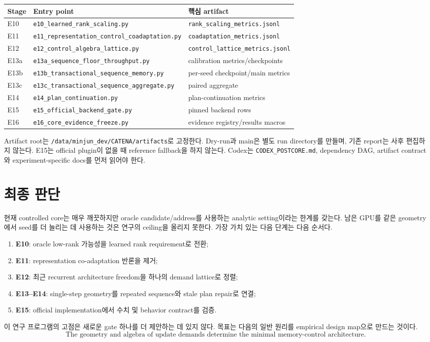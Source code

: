 \documentclass[10.3pt,a4paper]{article}
\begin{document}
\begin{center}
\begin{tabularx}{\textwidth}{l l X}
\toprule
Stage & Entry point & 핵심 artifact \\
\midrule
E10 & \texttt{e10\_learned\_rank\_scaling.py} & \texttt{rank\_scaling\_metrics.jsonl} \\
E11 & \texttt{e11\_representation\_control\_coadaptation.py} & \texttt{coadaptation\_metrics.jsonl} \\
E12 & \texttt{e12\_control\_algebra\_lattice.py} & \texttt{control\_lattice\_metrics.jsonl} \\
E13a & \texttt{e13a\_sequence\_floor\_throughput.py} & calibration metrics/checkpoints \\
E13b & \texttt{e13b\_transactional\_sequence\_memory.py} & per-seed checkpoint/main metrics \\
E13c & \texttt{e13c\_transactional\_sequence\_aggregate.py} & paired aggregate \\
E14 & \texttt{e14\_plan\_continuation.py} & plan-continuation metrics \\
E15 & \texttt{e15\_official\_backend\_gate.py} & pinned backend rows \\
E16 & \texttt{e16\_core\_evidence\_freeze.py} & evidence registry/results macros \\
\bottomrule
\end{tabularx}
\end{center}

Artifact root는 \texttt{/data/minjun\_dev/CATENA/artifacts}로 고정한다. Dry-run과 main은 별도 run directory를 만들며, 기존 report는 사후 편집하지 않는다. E15는 official plugin이 없을 때 reference fallback을 하지 않는다. Codex는 \texttt{CODEX\_POSTCORE.md}, dependency DAG, artifact contract와 experiment-specific docs를 먼저 읽어야 한다.

\section{최종 판단}
현재 controlled core는 매우 깨끗하지만 oracle candidate/address를 사용하는 analytic setting이라는 한계를 갖는다. 남은 GPU를 같은 geometry에서 seed를 더 늘리는 데 사용하는 것은 연구의 ceiling을 올리지 못한다. 가장 가치 있는 다음 단계는 다음 순서다.

\begin{enumerate}
\item \textbf{E10}: oracle low-rank 가능성을 learned rank requirement로 전환;
\item \textbf{E11}: representation co-adaptation 반론을 제거;
\item \textbf{E12}: 최근 recurrent architecture freedom을 하나의 demand lattice로 정렬;
\item \textbf{E13--E14}: single-step geometry를 repeated sequence와 stale plan repair로 연결;
\item \textbf{E15}: official implementation에서 수치 및 behavior contract를 검증.
\end{enumerate}

이 연구 프로그램의 고점은 새로운 gate 하나를 더 제안하는 데 있지 않다. 목표는 다음의 일반 원리를 empirical design map으로 만드는 것이다.
\[
\boxed{
\text{The geometry and algebra of update demands determine the minimal memory-control architecture.}
}
\]

\printbibliography
\end{document}
